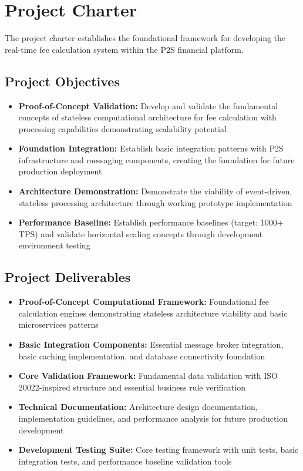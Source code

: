 \section{Project Charter}

The project charter establishes the foundational framework for developing the real-time fee calculation system within the P2S financial platform.

\subsection{Project Objectives}

\begin{itemize}
    \item \textbf{Proof-of-Concept Validation:} Develop and validate the fundamental concepts of stateless computational architecture for fee calculation with processing capabilities demonstrating scalability potential
    \item \textbf{Foundation Integration:} Establish basic integration patterns with P2S infrastructure and messaging components, creating the foundation for future production deployment
    \item \textbf{Architecture Demonstration:} Demonstrate the viability of event-driven, stateless processing architecture through working prototype implementation
    \item \textbf{Performance Baseline:} Establish performance baselines (target: 1000+ TPS) and validate horizontal scaling concepts through development environment testing
\end{itemize}

\subsection{Project Deliverables}

\begin{itemize}
    \item \textbf{Proof-of-Concept Computational Framework:} Foundational fee calculation engines demonstrating stateless architecture viability and basic microservices patterns
    \item \textbf{Basic Integration Components:} Essential message broker integration, basic caching implementation, and database connectivity foundation
    \item \textbf{Core Validation Framework:} Fundamental data validation with ISO 20022-inspired structure and essential business rule verification
    \item \textbf{Technical Documentation:} Architecture design documentation, implementation guidelines, and performance analysis for future production development
    \item \textbf{Development Testing Suite:} Core testing framework with unit tests, basic integration tests, and performance baseline validation tools
\end{itemize}

